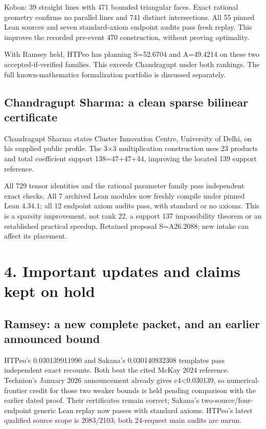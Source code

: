 \documentclass[10pt,a4paper]{article}
\begin{document}
Kobon: 39 straight lines with 471 bounded triangular faces. Exact rational geometry confirms no parallel lines and 741 distinct intersections. All 55 pinned Lean sources and seven standard-axiom endpoint audits pass fresh replay. This improves the recorded pre-event 470 construction, without proving optimality.

With Ramsey held, HTPeo has planning S=52.6704 and A=49.4214 on these two accepted-if-verified families. This exceeds Chandragupt under both rankings. The full known-mathematics formalization portfolio is discussed separately.

\subsection{Chandragupt Sharma: a clean sparse bilinear certificate}
Chandragupt Sharma states Cluster Innovation Centre, University of Delhi, on his supplied public profile. The 3\ensuremath{\times}3 multiplication construction uses 23 products and total coefficient support 138=47+47+44, improving the located 139 support reference.

All 729 tensor identities and the rational parameter family pass independent exact checks. All 7 archived Lean modules now freshly compile under pinned Lean 4.34.1; all 12 endpoint axiom audits pass, with standard or no axioms. This is a sparsity improvement, not rank 22, a support 137 impossibility theorem or an established practical speedup. Retained proposal S=A26.2088; new intake can affect its placement.

\clearpage
\section{4. Important updates and claims kept on hold}
\subsection{Ramsey: a new complete packet, and an earlier announced bound}
HTPeo's 0.030139911990 and Sakana's 0.030140932308 templates pass independent exact recounts. Both beat the cited McKay 2024 reference. Technion's January 2026 announcement already gives c4<0.030139, so numerical-frontier credit for those two weaker bounds is held pending comparison with the earlier dated proof. Their certificates remain correct; Sakana's two-source/four-endpoint generic Lean replay now passes with standard axioms. HTPeo's latest qualified source scope is 2083/2103; both 24-request main audits are unrun.
\end{document}
